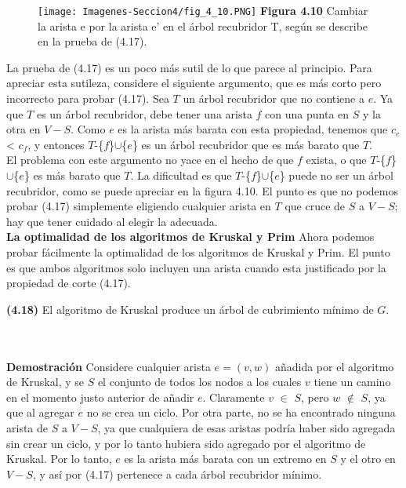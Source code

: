\documentclass[a4paper]{article}
\begin{document}
\begin{figure}[h]
\centering
\texttt{[image: Imagenes-Seccion4/fig\_4\_10.PNG]}
\textbf{Figura 4.10} Cambiar la arista e por la arista e' en el árbol recubridor T, según se describe en la prueba de (4.17).
\end{figure}
    
La prueba de (4.17) es un poco más sutil de lo que parece al principio. Para apreciar esta sutileza, considere el siguiente argumento, que es más corto pero incorrecto para probar (4.17). Sea $T$ un árbol recubridor que no contiene a $e$. Ya que $T$ es un árbol recubridor, debe tener una arista $f$ con una punta en $S$ y la otra en $V-S$. Como $e$ es la arista más barata con esta propiedad, tenemos que $c_e$ < $c_f$, y entonces $T$-\{$f$\}\(\cup\)\{$e$\} es un árbol recubridor que es más barato que $T$.\\

El problema con este argumento no yace en el hecho de que $f$ exista, o que $T$-\{$f$\}\(\cup\)\{$e$\} es más barato que $T$. La dificultad es que $T$-\{$f$\}\(\cup\)\{$e$\} puede no ser un árbol recubridor, como se puede apreciar en la figura 4.10. El punto es que no podemos probar (4.17) simplemente eligiendo cualquier arista en $T$ que cruce de $S$ a $V-S$; hay que tener cuidado al elegir la adecuada.\\
    
\textbf{La optimalidad de los algoritmos de Kruskal y Prim} Ahora podemos probar fácilmente la optimalidad de los algoritmos de Kruskal y Prim. El punto es que ambos algoritmos solo incluyen una arista cuando esta justificado por la propiedad de corte (4.17).\\

\colorbox{mygray}{\parbox{15cm}{
\textbf{(4.18)}  El algoritmo de Kruskal produce un árbol de cubrimiento mínimo de $G$.}}\\\\

\textbf{Demostración} Considere cualquier arista $e=(v,w)$ añadida por el algoritmo de Kruskal, y se $S$ el conjunto de todos los nodos a los cuales $v$ tiene un camino en el momento justo anterior de añadir $e$. Claramente $v$ \(\in\) $S$, pero $w$ \(\notin\) $S$, ya que al agregar $e$ no se crea un ciclo. Por otra parte, no se ha encontrado ninguna arista de $S$ a $V-S$, ya que cualquiera de esas aristas podría haber sido agregada sin crear un ciclo, y por lo tanto hubiera sido agregado por el algoritmo de Kruskal. Por lo tanto, $e$ es la arista más barata con un extremo en $S$ y el otro en $V-S$, y así por (4.17) pertenece a cada árbol recubridor mínimo.\\
\end{document}
